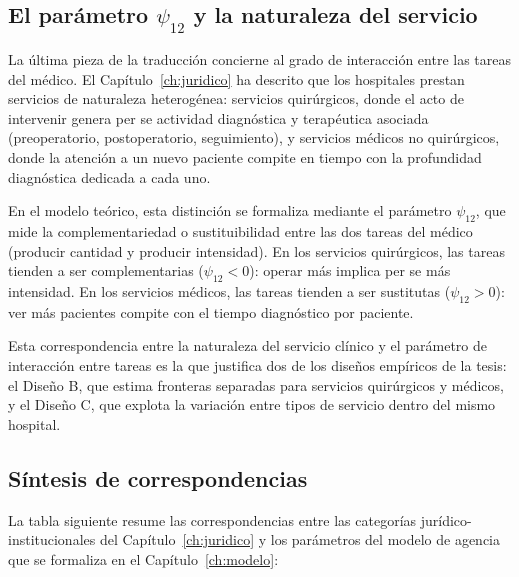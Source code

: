 \subsection{El parámetro $\psi_{12}$ y la naturaleza del servicio}

La última pieza de la traducción concierne al grado de interacción entre las tareas del médico. El Capítulo~\ref{ch:juridico} ha descrito que los hospitales prestan servicios de naturaleza heterogénea: servicios quirúrgicos, donde el acto de intervenir genera per se actividad diagnóstica y terapéutica asociada (preoperatorio, postoperatorio, seguimiento), y servicios médicos no quirúrgicos, donde la atención a un nuevo paciente compite en tiempo con la profundidad diagnóstica dedicada a cada uno.

En el modelo teórico, esta distinción se formaliza mediante el parámetro $\psi_{12}$, que mide la complementariedad o sustituibilidad entre las dos tareas del médico (producir cantidad y producir intensidad). En los servicios quirúrgicos, las tareas tienden a ser complementarias ($\psi_{12} < 0$): operar más implica per se más intensidad. En los servicios médicos, las tareas tienden a ser sustitutas ($\psi_{12} > 0$): ver más pacientes compite con el tiempo diagnóstico por paciente.

Esta correspondencia entre la naturaleza del servicio clínico y el parámetro de interacción entre tareas es la que justifica dos de los diseños empíricos de la tesis: el Diseño B, que estima fronteras separadas para servicios quirúrgicos y médicos, y el Diseño C, que explota la variación entre tipos de servicio dentro del mismo hospital.

\subsection{Síntesis de correspondencias}

La tabla siguiente resume las correspondencias entre las categorías jurídico-institucionales del Capítulo~\ref{ch:juridico} y los parámetros del modelo de agencia que se formaliza en el Capítulo~\ref{ch:modelo}:


